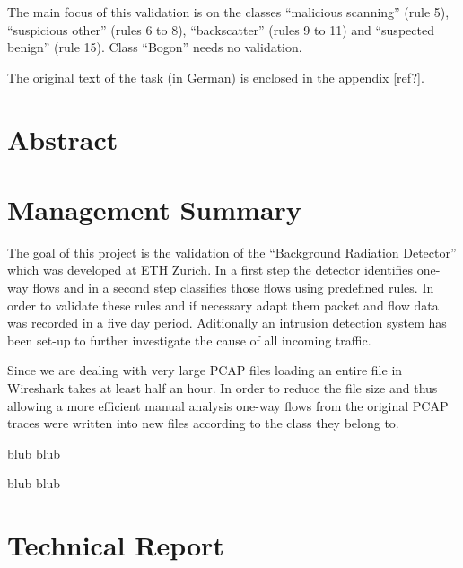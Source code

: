 \documentclass[a4paper]{scrartcl}
\begin{document}
The main focus of this validation is on the classes ``malicious scanning'' (rule 5), ``suspicious other'' (rules 6 to 8), ``backscatter'' (rules 9 to 11) and ``suspected benign'' (rule 15). Class ``Bogon'' needs no validation.

The original text of the task (in German) is enclosed in the appendix [ref?].
\newpage

\section{Abstract}

\section{Management Summary}
The goal of this project is the validation of the ``Background Radiation Detector'' which was developed at ETH Zurich. In a first step the detector identifies one-way flows and in a second step classifies those flows using predefined rules. In order to validate these rules and if necessary adapt them packet and flow data was recorded in a five day period. Aditionally an intrusion detection system has been set-up to further investigate the cause of all incoming traffic.

Since we are dealing with very large PCAP files loading an entire file in Wireshark takes at least half an hour. In order to reduce the file size and thus allowing a more efficient manual analysis one-way flows from the original PCAP traces were written into new files according to the class they belong to.


blub  blub

blub  blub

\section{Technical Report}
\end{document}

